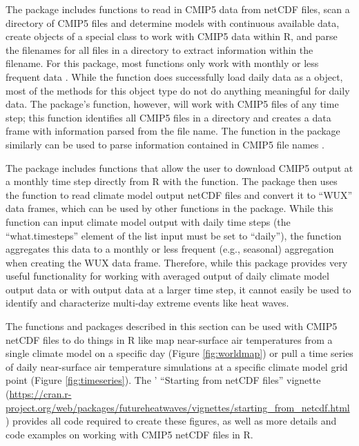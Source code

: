 The  package includes functions to read in CMIP5 data from
netCDF files, scan a directory of CMIP5 files and determine models with
continuous available data, create objects of a special 
class to work with CMIP5 data within R, and parse the filenames for all
files in a directory to extract information within the filename. For
this package, most functions only work with monthly or less frequent
data \citep{RCMIP5}. While the  function does
successfully load daily data as a  object, most of the
methods for this object type do not do anything meaningful for daily
data. The package's  function, however, will work with
CMIP5 files of any time step; this function identifies all CMIP5 files
in a directory and creates a data frame with information parsed from the
file name. The  function in the
 package similarly can be used to parse information
contained in CMIP5 file names \citep{ncdf4.helpers}.

The  package \citep{wux} includes functions that allow the user
to download CMIP5 output at a monthly time step directly from R with the
 function. The package then uses the
 function to read climate model output netCDF files and
convert it to ``WUX'' data frames, which can be used by other functions
in the package. While this function can input climate model output with
daily time steps (the ``what.timesteps'' element of the
 list input must be set to ``daily''), the function
aggregates this data to a monthly or less frequent (e.g., seasonal)
aggregation when creating the WUX data frame. Therefore, while this
package provides very useful functionality for working with averaged
output of daily climate model output data or with output data at a
larger time step, it cannot easily be used to identify and characterize
multi-day extreme events like heat waves.

The functions and packages described in this section can be used with
CMIP5 netCDF files to do things in R like map near-surface air
temperatures from a single climate model on a specific day (Figure
\ref{fig:worldmap}) or pull a time series of daily near-surface air
temperature simulations at a specific climate model grid point (Figure
\ref{fig:timeseries}). The ' ``Starting from netCDF
files'' vignette
(\url{https://cran.r-project.org/web/packages/futureheatwaves/vignettes/starting_from_netcdf.html})
provides all code required to create these figures, as well as more
details and code examples on working with CMIP5 netCDF files in R.

